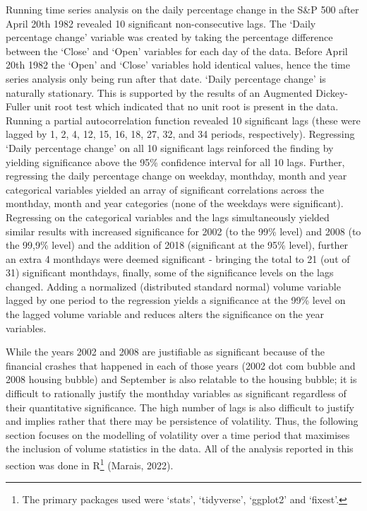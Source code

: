 \documentclass[11pt,preprint, authoryear]{elsarticle}
\numberwithin{equation}{section}
\numberwithin{figure}{section}
\numberwithin{table}{section}
\let\rmarkdownfootnote\footnote%
\def\footnote{\protect\rmarkdownfootnote}
\begin{document}
Running time series analysis on the daily percentage change in the S\&P
500 after April 20th 1982 revealed 10 significant non-consecutive lags.
The `Daily percentage change' variable was created by taking the
percentage difference between the `Close' and `Open' variables for each
day of the data. Before April 20th 1982 the `Open' and `Close' variables
hold identical values, hence the time series analysis only being run
after that date. `Daily percentage change' is naturally stationary. This
is supported by the results of an Augmented Dickey-Fuller unit root test
which indicated that no unit root is present in the data. Running a
partial autocorrelation function revealed 10 significant lags (these
were lagged by 1, 2, 4, 12, 15, 16, 18, 27, 32, and 34 periods,
respectively). Regressing `Daily percentage change' on all 10
significant lags reinforced the finding by yielding significance above
the 95\% confidence interval for all 10 lags. Further, regressing the
daily percentage change on weekday, monthday, month and year categorical
variables yielded an array of significant correlations across the
monthday, month and year categories (none of the weekdays were
significant). Regressing on the categorical variables and the lags
simultaneously yielded similar results with increased significance for
2002 (to the 99\% level) and 2008 (to the 99,9\% level) and the addition
of 2018 (significant at the 95\% level), further an extra 4 monthdays
were deemed significant - bringing the total to 21 (out of 31)
significant monthdays, finally, some of the significance levels on the
lags changed. Adding a normalized (distributed standard normal) volume
variable lagged by one period to the regression yields a significance at
the 99\% level on the lagged volume variable and reduces alters the
significance on the year variables.

While the years 2002 and 2008 are justifiable as significant because of
the financial crashes that happened in each of those years (2002 dot com
bubble and 2008 housing bubble) and September is also relatable to the
housing bubble; it is difficult to rationally justify the monthday
variables as significant regardless of their quantitative significance.
The high number of lags is also difficult to justify and implies rather
that there may be persistence of volatility. Thus, the following section
focuses on the modelling of volatility over a time period that maximises
the inclusion of volume statistics in the data. All of the analysis
reported in this section was done in R\footnote{The primary packages
  used were `stats', `tidyverse', `ggplot2' and `fixest'.} (Marais,
2022).
\end{document}
